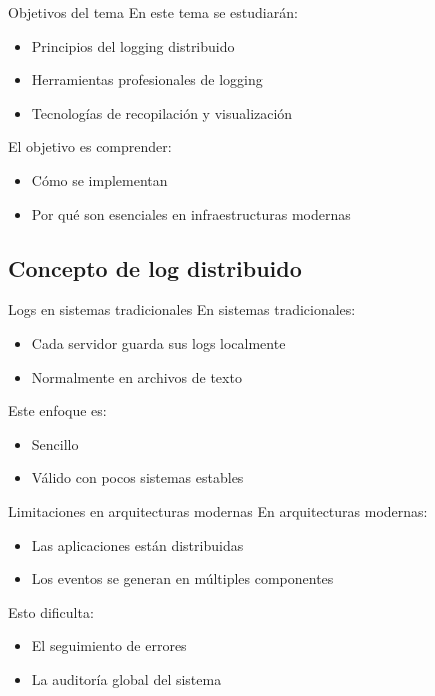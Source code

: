 \documentclass{beamer}
\begin{document}
\begin{frame}{Objetivos del tema}
En este tema se estudiarán:
\begin{itemize}
    \item Principios del logging distribuido
    \item Herramientas profesionales de logging
    \item Tecnologías de recopilación y visualización
\end{itemize}

\vspace{0.3cm}
El objetivo es comprender:
\begin{itemize}
    \item Cómo se implementan
    \item Por qué son esenciales en infraestructuras modernas
\end{itemize}
\end{frame}

\subsection{Concepto de log distribuido}

\begin{frame}{Logs en sistemas tradicionales}
En sistemas tradicionales:
\begin{itemize}
    \item Cada servidor guarda sus logs localmente
    \item Normalmente en archivos de texto
\end{itemize}

\vspace{0.3cm}
Este enfoque es:
\begin{itemize}
    \item Sencillo
    \item Válido con pocos sistemas estables
\end{itemize}
\end{frame}

\begin{frame}{Limitaciones en arquitecturas modernas}
En arquitecturas modernas:
\begin{itemize}
    \item Las aplicaciones están distribuidas
    \item Los eventos se generan en múltiples componentes
\end{itemize}

\vspace{0.3cm}
Esto dificulta:
\begin{itemize}
    \item El seguimiento de errores
    \item La auditoría global del sistema
\end{itemize}
\end{frame}
\end{document}
